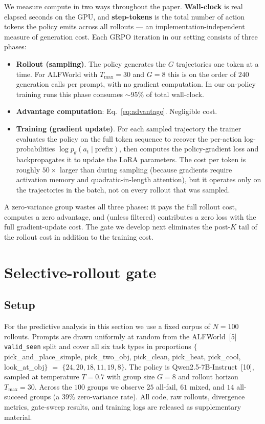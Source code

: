 \documentclass{article}
\begin{document}
We measure compute in two ways throughout the paper.
\textbf{Wall-clock} is real elapsed seconds on the GPU, and
\textbf{step-tokens} is the total number of action tokens the
policy emits across all rollouts --- an
implementation-independent measure of generation cost. Each
GRPO iteration in our setting consists of three phases:

\begin{itemize}[leftmargin=*,topsep=0pt,itemsep=2pt]
\item \textbf{Rollout (sampling)}. The policy generates the $G$
trajectories one token at a time. For ALFWorld with $T_{\max}\!=\!30$
and $G\!=\!8$ this is on the order of $240$ generation calls per
prompt, with no gradient computation. In our on-policy training
runs this phase consumes ${\sim}95\%$ of total wall-clock.

\item \textbf{Advantage computation}: Eq.~\ref{eq:advantage}.
Negligible cost.

\item \textbf{Training (gradient update)}. For each sampled
trajectory the trainer evaluates the policy on the full token
sequence to recover the per-action log-probabilities
$\log p_\theta(a_t \mid \text{prefix})$, then computes the
policy-gradient loss and backpropagates it to update the LoRA
parameters. The cost per token is roughly $50\times$ larger
than during sampling (because gradients require activation memory
and quadratic-in-length attention), but it operates only on the
trajectories in the batch, not on every rollout that was sampled.
\end{itemize}

A zero-variance group wastes all three phases: it pays the
full rollout cost, computes a zero advantage, and (unless
filtered) contributes a zero loss with the full gradient-update
cost. The gate we develop next eliminates the post-$K$ tail of
the rollout cost in addition to the training cost.


\section{Selective-rollout gate}
\label{sec:method}
\label{sec:experiments}

\subsection{Setup}
\label{sec:setup}

For the predictive analysis in this section we use a fixed corpus
of $N\!=\!100$ rollouts. Prompts are drawn uniformly at random
from the ALFWorld~[5] \texttt{valid\_seen} split and cover all six
task types in proportions $\{$pick\_and\_place\_simple,
pick\_two\_obj, pick\_clean, pick\_heat, pick\_cool,
look\_at\_obj$\}$ $=$ $\{24, 20, 18, 11, 19, 8\}$. The policy is
Qwen2.5-7B-Instruct~[10], sampled at temperature $T\!=\!0.7$
with group size $G\!=\!8$ and rollout horizon $T_{\max}\!=\!30$.
Across the $100$ groups we observe $25$ all-fail, $61$ mixed,
and $14$ all-succeed groups (a $39\%$ zero-variance rate). All
code, raw rollouts, divergence metrics, gate-sweep results, and
training logs are released as supplementary material.
\end{document}
